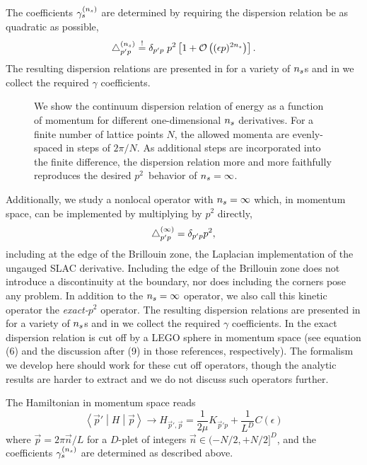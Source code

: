 The coefficients $\gamma_{s}^{({n_s})}$ are determined by requiring the dispersion relation be as quadratic as possible,
\begin{equation}
    \label{eq:gamma determination}
    \mathop{}\!\mathbin\bigtriangleup^{({n_s})}_{p'p}
    \overset{!}{=}
    \delta_{p'p} \;
    p^2 \left[
        1 + \mathcal{O}\left((\epsilon p)^{2{n_s}}\right)
    \right].
\end{equation}
The resulting dispersion relations are presented in  for a variety of ${n_s}$s and in  we collect the required $\gamma$ coefficients.

\begin{figure}
    
    \caption{We show the continuum dispersion relation of energy as a function of momentum for different one-dimensional ${n_s}$ derivatives.  For a finite number of lattice points $N$, the allowed momenta are evenly-spaced in steps of $2\pi/N$.
    As additional steps are incorporated into the finite difference, the dispersion relation more and more faithfully reproduces the desired $p^2$~behavior of ${n_s}=\infty$.
    }
    \label{fig:dispersion relation}
\end{figure}

Additionally, we study a nonlocal operator with ${n_s}=\infty$ which, in momentum space, can be implemented by multiplying by $p^2$ directly,
\begin{equation}
    \mathop{}\!\mathbin\bigtriangleup^{(\infty)}_{p'p}
    =
    \delta_{p'p} p^2,
\end{equation}
including at the edge of the Brillouin zone, the Laplacian implementation of the ungauged SLAC derivative.
Including the edge of the Brillouin zone does not introduce a discontinuity at the boundary, nor does including the corners pose any problem.
In addition to the ${n_s}=\infty$ operator, we also call this kinetic operator the \emph{exact-$p^2$} operator.
The resulting dispersion relations are presented in  for a variety of ${n_s}$s and in  we collect the required $\gamma$ coefficients.
In  the exact dispersion relation is cut off by a LEGO sphere in momentum space (see equation (6) and the discussion after (9) in those references, respectively).
The formalism we develop here should work for these cut off operators, though the analytic results are harder to extract and we do not discuss such operators further.

The Hamiltonian in momentum space reads
\begin{equation}
    \label{eq:p space hamiltonian}
    \left\langle \vec{p}' \middle| H \middle| \vec{p} \right\rangle
    \rightarrow
    H_{\vec{p}',\vec{p}}
    =
    \frac{1}{2\mu} K_{\vec{p}'p}
    +\frac{1}{L^D}C(\epsilon)
\end{equation}
where $\vec{p} = 2\pi \vec{n}/L$ for a $D$-plet of integers $\vec{n} \in (-N/2, +N/2]^D$, and the coefficients $\gamma_{s}^{({n_s})}$ are determined as described above.


